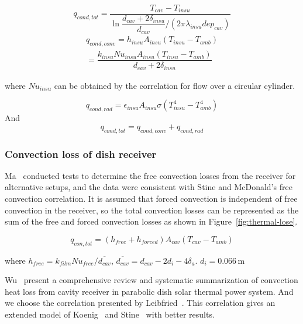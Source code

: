 \documentclass{article}
\begin{document}
\begin{equation*}
	q_{cond,tot}=\dfrac{T_{cav}-T_{insu}}{\ln\dfrac{d_{cav}+2\delta_{insu}}{d_{cav}}/(2\pi\lambda_{insu}dep_{cav})}
\end{equation*}
\begin{equation*}
\begin{split}
	q_{cond,conv}=h_{insu}A_{insu}(T_{insu}-T_{amb})
	\\=\dfrac{k_{insu}Nu_{insu}A_{insu}(T_{insu}-T_{amb})}{d_{cav}+2\delta_{insu}}
\end{split}
\end{equation*}

where $Nu_{insu}$ can be obtained by the correlation for flow over a circular cylinder.~\cite{Churchill1977} 

\begin{equation*}
	q_{cond,rad}=\epsilon_{insu}A_{insu}\sigma(T_{insu}^4 - T_{amb}^4)	
\end{equation*}
And 
\begin{equation*}
	q_{cond,tot}=q_{cond,conv}+q_{cond,rad}	
\end{equation*}

\subsubsection{Convection loss of dish receiver}
Ma~\cite{Ma1993} conducted tests to determine the free convection losses from the receiver for alternative setups, and the data were consistent with Stine and McDonald's free convection correlation. It is assumed that forced convection is independent of free convection in the receiver, so the total convection losses can be represented as the sum of the free and forced convection losses as shown in Figure~\ref{fig:thermal-lose}.

\begin{equation*}
	q_{con,tot} = (h_{free} + h_{forced})A_{cav}(T_{cav}-T_{amb})
\end{equation*}


where $h_{free}=k_{film}Nu_{free}/\overline{d_{cav}}$, $\overline{d_{cav}}=d_{cav}-2d_i-4 \delta_a$.
$d_{i}=0.066\,$m

Wu~\cite{Wu2010} present a comprehensive review and systematic summarization of convection heat loss from cavity receiver in parabolic dish solar thermal power system. And we choose the correlation presented by Leibfried~\cite{Leibfried1995}. This correlation gives an extended model of Koenig~\cite{Koenig1981} and Stine~\cite{Stine1994} with better results.
\end{document}

